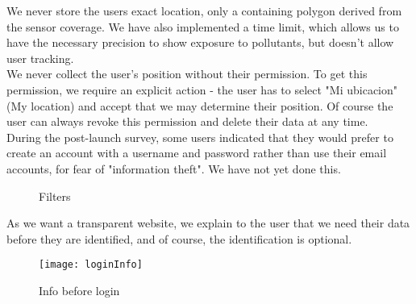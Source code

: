 We never store the users exact location, only a containing polygon derived from the sensor coverage.
We have also implemented a time limit, which allows us to have the necessary precision to show exposure to pollutants, but doesn't allow user tracking.\\

We never collect the user's position without their permission.
To get this permission, we require an explicit action - the user has to select "Mi ubicacion" (My location) and accept that we may determine their position.
Of course the user can always revoke this permission and delete their data at any time. \\

During the post-launch survey, some users indicated that they would prefer to create an account with a username and password rather than use their email accounts, for fear of "information theft".
We have not yet done this. \\

\begin{figure}[ht]
    \centering
    \hfill
    \caption{Filters}
\end{figure}


As we want a transparent website, we explain to the user that we need their data before
they are identified, and of course, the identification is optional. \\

\begin{figure}[ht]
    \centering
    \texttt{[image: loginInfo]}
    \caption{Info before login}
\end{figure}